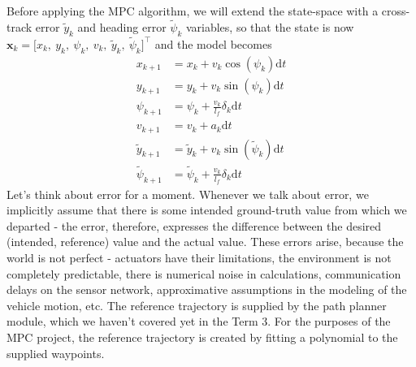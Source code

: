 \documentclass[a4paper]{article}
\begin{document}
Before applying the MPC algorithm, we will extend the state-space with a cross-track error \( \tilde{y}_k \) and heading error \( \tilde{\psi}_k \) variables, so that the state is now \( \bm{x}_k = \big[x_k,\ y_k,\ \psi_k,\ v_k,\ \tilde{y}_k,\ \tilde{\psi}_k \big]^\top \) and the model becomes
\begin{subequations}
\begin{align}
x_{k+1} 			&= x_k + v_k\cos(\psi_k) \mathrm{d}t \label{eq:kbm_start}\\
y_{k+1} 			&= y_k + v_k\sin(\psi_k) \mathrm{d}t \\
\psi_{k+1} 			&= \psi_k + \frac{v_k}{l_f}\delta_k \mathrm{d}t \\
v_{k+1} 			&= v_k + a_k\mathrm{d}t \\
\tilde{y}_{k+1}		&= \tilde{y}_k + v_k\sin(\tilde{\psi}_k)\mathrm{d}t \\
\tilde{\psi}_{k+1}	&= \tilde{\psi}_{k} + \frac{v_k}{l_f} \delta_k \mathrm{d}t \label{eq:kbm_end}
\end{align}
\end{subequations}
Let's think about error for a moment. 
Whenever we talk about error, we implicitly assume that there is some intended ground-truth value from which we departed - the error, therefore, expresses the difference between the desired (intended, reference) value and the actual value.
These errors arise, because the world is not perfect - actuators have their limitations, the environment is not completely predictable, there is numerical noise in calculations, communication delays on the sensor network, approximative assumptions in the modeling of the vehicle motion, etc.
The reference trajectory is supplied by the path planner module, which we haven't covered yet in the Term 3. 
For the purposes of the MPC project, the reference trajectory is created by fitting a polynomial to the supplied waypoints.
\end{document}
